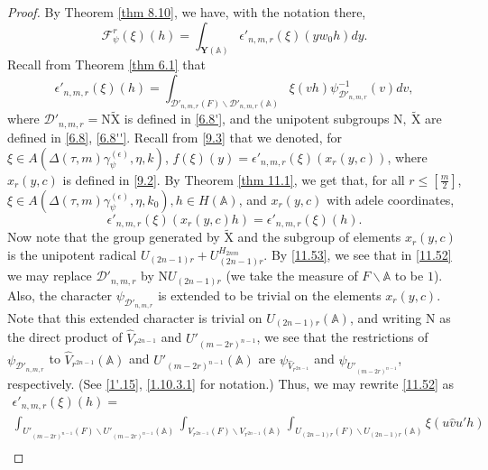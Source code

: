 \documentclass[12pts]{amsart}
\newcommand{\BA}{{\mathbb {A}}}
\begin{document}
\begin{proof}
By Theorem \ref{thm 8.10}, we have, with the notation there, 
\begin{equation}\label{11.52}
\mathcal{F}_\psi^r(\xi)(h)=\int_{\mathbf{Y}(\BA)}\epsilon'_{n,m,r}(\xi)(yw_0h)dy.
\end{equation}
Recall from Theorem \ref{thm 6.1} that
\begin{equation}\label{11.52}
\epsilon'_{n,m,r}(\xi)(h)=\int_{\mathcal{D'}_{n,m,r}(F)\backslash
	\mathcal{D'}_{n,m,r}(\BA)}\xi(vh)\psi_{\mathcal{D'}_{n,m,r}}^{-1}(v)dv,
\end{equation}
where $\mathcal{D}'_{n,m,r}=\mathrm{N}\widetilde{\mathrm{X}}$ is defined in \eqref{6.8'}, and the unipotent subgroups $\mathrm{N},\ \widetilde{\mathrm{X}}$ are defined in \eqref {6.8}, \eqref{6.8''}. Recall from \eqref{9.3} that we denoted, for $\xi\in A(\Delta(\tau,m)\gamma_\psi^{(\epsilon)},\eta, k)$, $f(\xi)(y)=\epsilon'_{n,m,r}(\xi)(x_r(y,c))$, where $x_r(y,c)$ is defined in \eqref{9.2}. By Theorem \ref{thm 11.1}, we get that, for all $r\leq [\frac{m}{2}]$, $\xi\in A(\Delta(\tau,m)\gamma_\psi^{(\epsilon)},\eta, k_0), h\in H(\BA)$, and $x_r(y,c)$ with adele coordinates,
\begin{equation}\label{11.53}
 \epsilon'_{n,m,r}(\xi)(x_r(y,c)h)=\epsilon'_{n,m,r}(\xi)(h).
 \end{equation}
 Now note that the group generated by $\widetilde{\mathrm{X}}$ and the subgroup of elements $x_r(y,c)$ is the unipotent radical $U_{(2n-1)r}+U_{(2n-1)r}^{H_{2nm}}$. By \eqref{11.53}, we see that in \eqref{11.52} we may replace $\mathcal{D}'_{n,m,r}$ by $\mathrm{N}U_{(2n-1)r}$ (we take the measure of $F\backslash \BA$ to be $1$). Also, the character $\psi_{\mathcal{D}'_{n,m,r}}$ is extended to be trivial on the elements $x_r(y,c)$. Note that this extended character is trivial on $U_{(2n-1)r}(\BA)$, and writing $\mathrm{N}$ as the direct product of $\hat{V}_{r^{2n-1}}$ and $U'_{(m-2r)^{n-1}}$, we see that the restrictions of $\psi_{\mathcal{D}'_{n,m,r}}$ to $\hat{V}_{r^{2n-1}}(\BA)$ and $U'_{(m-2r)^{n-1}}(\BA)$ are $\psi_{\hat{V}_{r^{2n-1}}}$ and $\psi_{U'_{(m-2r)^{n-1}}}$, respectively. (See \eqref{1'.15}, \eqref{1.10.3.1} for notation.) Thus, we may rewrite \eqref{11.52} as
 \begin{multline}\label{11.54}
 \epsilon'_{n,m,r}(\xi)(h)=\\
 \int_{U'_{(m-2r)^{n-1}}(F)\backslash U'_{(m-2r)^{n-1}}(\BA)}\int_{V_{r^{2n-1}}(F)\backslash V_{r^{2n-1}}(\BA)}\int_{U_{(2n-1)r}(F)\backslash U_{(2n-1)r}(\BA)}\xi(u\hat{v}u'h)\\

\end{multline}
\end{proof}
\end{document}
